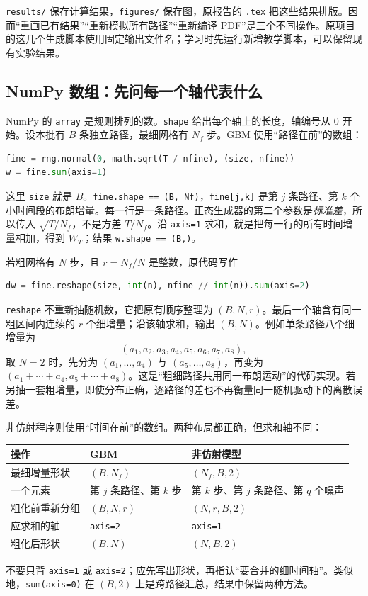 \documentclass[11pt,a4paper,fontset=none]{ctexart}
\numberwithin{equation}{section}
\begin{document}
\texttt{results/} 保存计算结果，\texttt{figures/} 保存图，原报告的 \texttt{.tex} 把这些结果排版。因而“重画已有结果”“重新模拟所有路径”“重新编译 PDF”是三个不同操作。原项目的这几个生成脚本使用固定输出文件名；学习时先运行新增教学脚本，可以保留现有实验结果。

\subsection{NumPy 数组：先问每一个轴代表什么}

NumPy 的 \texttt{array} 是规则排列的数。\texttt{shape} 给出每个轴上的长度，轴编号从 0 开始。设本批有 $B$ 条独立路径，最细网格有 $N_f$ 步。GBM 使用“路径在前”的数组：
\begin{lstlisting}[language=Python]
fine = rng.normal(0, math.sqrt(T / nfine), (size, nfine))
w = fine.sum(axis=1)
\end{lstlisting}
这里 \texttt{size} 就是 $B$。\texttt{fine.shape == (B, Nf)}，\texttt{fine[j,k]} 是第 $j$ 条路径、第 $k$ 个小时间段的布朗增量。每一行是一条路径。正态生成器的第二个参数是\emph{标准差}，所以传入 $\sqrt{T/N_f}$，不是方差 $T/N_f$。沿 \texttt{axis=1} 求和，就是把每一行的所有时间增量相加，得到 $W_T$；结果 \texttt{w.shape == (B,)}。

若粗网格有 $N$ 步，且 $r=N_f/N$ 是整数，原代码写作
\begin{lstlisting}[language=Python]
dw = fine.reshape(size, int(n), nfine // int(n)).sum(axis=2)
\end{lstlisting}
\texttt{reshape} 不重新抽随机数，它把原有顺序整理为 $(B,N,r)$。最后一个轴含有同一粗区间内连续的 $r$ 个细增量；沿该轴求和，输出 $(B,N)$。例如单条路径八个细增量为
\[
(a_1,a_2,a_3,a_4,a_5,a_6,a_7,a_8),
\]
取 $N=2$ 时，先分为 $(a_1,\ldots,a_4)$ 与 $(a_5,\ldots,a_8)$，再变为 $(a_1+\cdots+a_4,a_5+\cdots+a_8)$。这是“粗细路径共用同一布朗运动”的代码实现。若另抽一套粗增量，即使分布正确，逐路径的差也不再衡量同一随机驱动下的离散误差。

非仿射程序则使用“时间在前”的数组。两种布局都正确，但求和轴不同：
\begin{center}
\small
\begin{tabularx}{\textwidth}{@{}lYY@{}}
\toprule
操作 & GBM & 非仿射模型\\
\midrule
最细增量形状 & $(B,N_f)$ & $(N_f,B,2)$\\
一个元素 & 第 $j$ 条路径、第 $k$ 步 & 第 $k$ 步、第 $j$ 条路径、第 $q$ 个噪声\\
粗化前重新分组 & $(B,N,r)$ & $(N,r,B,2)$\\
应求和的轴 & \texttt{axis=2} & \texttt{axis=1}\\
粗化后形状 & $(B,N)$ & $(N,B,2)$\\
\bottomrule
\end{tabularx}
\end{center}
不要只背 \texttt{axis=1} 或 \texttt{axis=2}；应先写出形状，再指认“要合并的细时间轴”。类似地，\texttt{sum(axis=0)} 在 $(B,2)$ 上是跨路径汇总，结果中保留两种方法。
\end{document}
